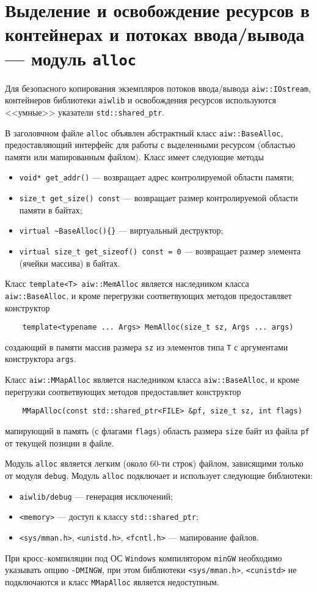 \section{Выделение и освобождение ресурсов  в контейнерах и потоках ввода/вывода --- модуль {\tt alloc}}
Для безопасного копирования экземпляров потоков ввода/вывода \verb'aiw::IOstream', контейнеров библиотеки
\verb'aiwlib' и освобождения ресурсов используются <<умные>> указатели \verb'std::shared_ptr'.

В заголовчном файле \verb'alloc' объявлен абстрактный класс \verb'aiw::BaseAlloc',
предоставляющий интерфейс для работы с выделенными ресурсом (областью памяти или мапированным файлом).
Класс имеет следующие методы
\begin{itemize}
\item \verb'void* get_addr()' --- возвращает адрес контролируемой области памяти;
\item \verb'size_t get_size() const'  --- возвращает размер контролируемой области памяти в байтах;
\item \verb'virtual ~BaseAlloc(){}' --- виртуальный деструктор;
\item \verb'virtual size_t get_sizeof() const = 0' --- возвращает размер элемента (ячейки массива) в байтах.
\end{itemize}

Класс \verb'template<T> aiw::MemAlloc' является наследником класса \verb'aiw::BaseAlloc',
и кроме перегрузки соответвующих методов предоставляет конструктор
\begin{verbatim}
    template<typename ... Args> MemAlloc(size_t sz, Args ... args)
\end{verbatim}
создающий в памяти массив размера \verb'sz' из элементов типа \verb'T' с аргументами конструктора \verb'args'.

Класс \verb'aiw::MMapAlloc' является наследником класса \verb'aiw::BaseAlloc',
и кроме перегрузки соответвующих методов предоставляет конструктор
\begin{verbatim}
    MMapAlloc(const std::shared_ptr<FILE> &pf, size_t sz, int flags)
\end{verbatim}
мапирующий в память (с флагами \verb'flags') область размера \verb'size' байт из файла \verb'pf' от текущей позиции в файле.

Модуль \verb'alloc' является легким (около 60-ти строк) файлом, зависящими только от модуля \verb'debug'.
Модуль \verb'alloc' подключает и использует следующие библиотеки:
\begin{itemize}
\item \verb'aiwlib/debug' --- генерация исключений;
\item \verb'<memory>' --- доступ к классу \verb'std::shared_ptr';
\item \verb'<sys/mman.h>', \verb'<unistd.h>', \verb'<fcntl.h>' --- мапирование файлов.  
\end{itemize}

При кросс--компиляции под ОС \verb'Windows' компилятором \verb'minGW' необходимо указывать опцию \verb'-DMINGW',
при этом библиотеки \verb'<sys/mman.h>', \verb'<cunistd>' не подключаются и
класс \verb'MMapAlloc' является недоступным.

